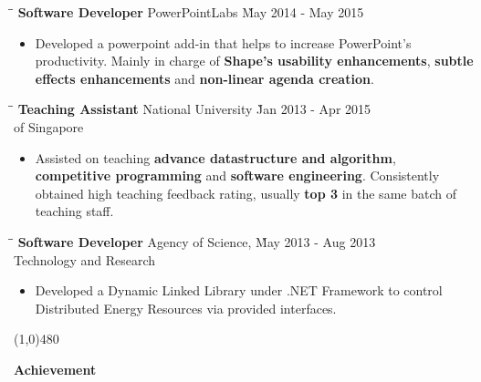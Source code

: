 \documentclass{article}
\begin{document}

\begin{tabbing}
\hspace{2.6in}\= \hspace{2.6in}\= \kill
{\bf Software Developer} \> PowerPointLabs \`May 2014 - May 2015\
\end{tabbing}

\begin{itemize}
    \item Developed a powerpoint add-in that helps to increase PowerPoint's productivity. Mainly in charge of {\bf Shape's usability enhancements}, {\bf subtle effects enhancements} and {\bf non-linear agenda creation}.\vspace{-6pt}
\end{itemize}

\begin{tabbing}
\hspace{2.6in}\= \hspace{2.6in}\= \kill
{\bf Teaching Assistant} \> National University \`Jan 2013 - Apr 2015\\
\> of Singapore
\end{tabbing}

\begin{itemize}
    \item Assisted on teaching {\bf advance datastructure and algorithm}, {\bf competitive programming} and {\bf software engineering}. Consistently obtained high teaching feedback rating, usually {\bf top 3} in the same batch of teaching staff.
\end{itemize}

\begin{tabbing}
\hspace{2.6in} \= \hspace{2.6in}\= \kill
{\bf Software Developer} \> Agency of Science,  \`May 2013 - Aug 2013\\
\> Technology and Research
\end{tabbing}

\begin{itemize}
  \item Developed a Dynamic Linked Library under .NET Framework to control Distributed Energy Resources via provided interfaces.
\end{itemize}

\centerline{\line(1,0){480}}

\medskip

\centerline {\Large \bf Achievement}
\end{document}

